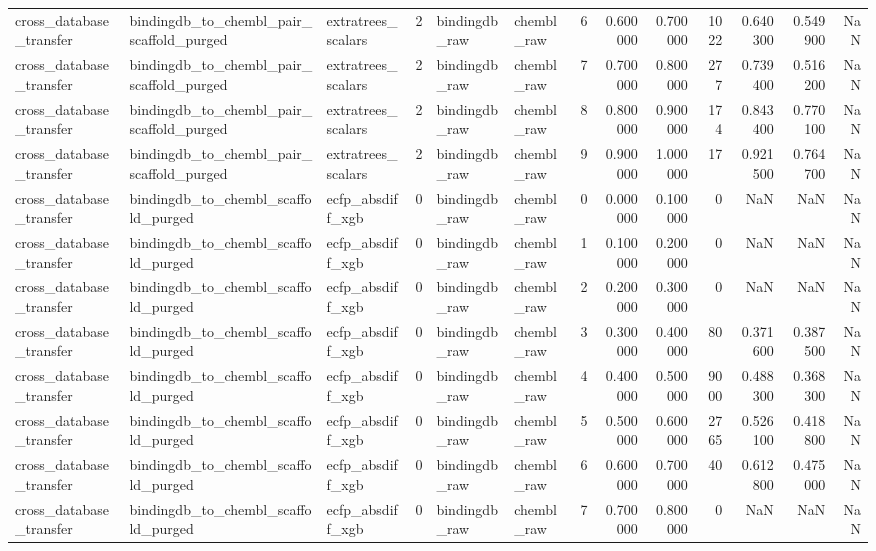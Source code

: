 \begin{longtable}{lllrllrrrrrrr}
cross\_database\_transfer & bindingdb\_to\_chembl\_pair\_scaffold\_purged & extratrees\_scalars & 2 & bindingdb\_raw & chembl\_raw & 6 & 0.600000 & 0.700000 & 1022 & 0.640300 & 0.549900 & NaN \\
cross\_database\_transfer & bindingdb\_to\_chembl\_pair\_scaffold\_purged & extratrees\_scalars & 2 & bindingdb\_raw & chembl\_raw & 7 & 0.700000 & 0.800000 & 277 & 0.739400 & 0.516200 & NaN \\
cross\_database\_transfer & bindingdb\_to\_chembl\_pair\_scaffold\_purged & extratrees\_scalars & 2 & bindingdb\_raw & chembl\_raw & 8 & 0.800000 & 0.900000 & 174 & 0.843400 & 0.770100 & NaN \\
cross\_database\_transfer & bindingdb\_to\_chembl\_pair\_scaffold\_purged & extratrees\_scalars & 2 & bindingdb\_raw & chembl\_raw & 9 & 0.900000 & 1.000000 & 17 & 0.921500 & 0.764700 & NaN \\
cross\_database\_transfer & bindingdb\_to\_chembl\_scaffold\_purged & ecfp\_absdiff\_xgb & 0 & bindingdb\_raw & chembl\_raw & 0 & 0.000000 & 0.100000 & 0 & NaN & NaN & NaN \\
cross\_database\_transfer & bindingdb\_to\_chembl\_scaffold\_purged & ecfp\_absdiff\_xgb & 0 & bindingdb\_raw & chembl\_raw & 1 & 0.100000 & 0.200000 & 0 & NaN & NaN & NaN \\
cross\_database\_transfer & bindingdb\_to\_chembl\_scaffold\_purged & ecfp\_absdiff\_xgb & 0 & bindingdb\_raw & chembl\_raw & 2 & 0.200000 & 0.300000 & 0 & NaN & NaN & NaN \\
cross\_database\_transfer & bindingdb\_to\_chembl\_scaffold\_purged & ecfp\_absdiff\_xgb & 0 & bindingdb\_raw & chembl\_raw & 3 & 0.300000 & 0.400000 & 80 & 0.371600 & 0.387500 & NaN \\
cross\_database\_transfer & bindingdb\_to\_chembl\_scaffold\_purged & ecfp\_absdiff\_xgb & 0 & bindingdb\_raw & chembl\_raw & 4 & 0.400000 & 0.500000 & 9000 & 0.488300 & 0.368300 & NaN \\
cross\_database\_transfer & bindingdb\_to\_chembl\_scaffold\_purged & ecfp\_absdiff\_xgb & 0 & bindingdb\_raw & chembl\_raw & 5 & 0.500000 & 0.600000 & 2765 & 0.526100 & 0.418800 & NaN \\
cross\_database\_transfer & bindingdb\_to\_chembl\_scaffold\_purged & ecfp\_absdiff\_xgb & 0 & bindingdb\_raw & chembl\_raw & 6 & 0.600000 & 0.700000 & 40 & 0.612800 & 0.475000 & NaN \\
cross\_database\_transfer & bindingdb\_to\_chembl\_scaffold\_purged & ecfp\_absdiff\_xgb & 0 & bindingdb\_raw & chembl\_raw & 7 & 0.700000 & 0.800000 & 0 & NaN & NaN & NaN \\

\end{longtable}
